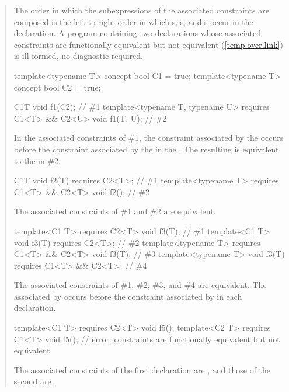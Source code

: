 \begin{quote}
\pnum
The order in which the subexpressions of the associated constraints
are composed is the left-to-right order in which 
s,
s, and
s occur in the declaration.
% 
\enternote
A program containing two declarations whose associated constraints are 
functionally equivalent but not equivalent (\ref{temp.over.link}) is 
ill-formed, no diagnostic required.
\exitnote
% 
\enterexample
\begin{codeblock}
template<typename T> concept bool C1 = true;
template<typename T> concept bool C2 = true;

C1{T} void f1(C2);                                                      // \#1
template<typename T, typename U> requires C1<T> && C2<U> void f1(T, U); // \#2
\end{codeblock}
% 
In the associated constraints of \#1, the constraint associated by the 
  occurs before the 
constraint associated by the  in the
 .
% 
The resulting  is equivalent to the 
 in \#2.
% 
\begin{codeblock}
C1{T} void f2(T) requires C2<T>;                        // \#1
template<typename T> requires C1<T> && C2<T> void f2(); // \#2
\end{codeblock}
The associated constraints of \#1 and \#2 are equivalent.

\begin{codeblock}
template<C1 T> requires C2<T> void f3(T);                // \#1
template<C1 T> void f3(T) requires C2<T>;                // \#2
template<typename T> requires C1<T> && C2<T> void f3(T); // \#3
template<typename T> void f3(T) requires C1<T> && C2<T>; // \#4
\end{codeblock}
The associated constraints of \#1, \#2, \#3, and \#4 are equivalent. The 
 associated by  occurs before 
the constraint associated by  in each declaration.
% 
\begin{codeblock}
template<C1 T> requires C2<T> void f5();
template<C2 T> requires C1<T> void f5(); // error: constraints are functionally equivalent but not equivalent
\end{codeblock}
% 
The associated constraints of the first declaration are
, and those of the second are
.
\exitexample
\end{quote}


